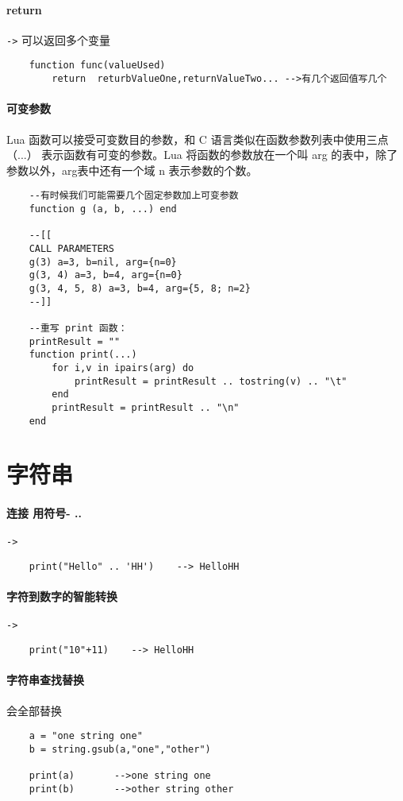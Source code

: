 \documentclass[UTF8,a4paper,12pt]{ctexart}
\begin{document}
	\paragraph{return}\verb|->|
		可以返回多个变量
		 \begin{lstlisting}
	function func(valueUsed)  
		return  returbValueOne,returnValueTwo... -->有几个返回值写几个
		 \end{lstlisting}
		 
	\paragraph{可变参数}Lua 函数可以接受可变数目的参数，和 C 语言类似在函数参数列表中使用三点（...）
	表示函数有可变的参数。Lua 将函数的参数放在一个叫 arg 的表中，除了参数以外，arg表中还有一个域 n 表示参数的个数。
		 \begin{lstlisting}
	--有时候我们可能需要几个固定参数加上可变参数
	function g (a, b, ...) end
	
	--[[ 
	CALL PARAMETERS
	g(3) a=3, b=nil, arg={n=0}
	g(3, 4) a=3, b=4, arg={n=0}
	g(3, 4, 5, 8) a=3, b=4, arg={5, 8; n=2}
	--]]
	
	--重写 print 函数：
	printResult = ""
	function print(...)
		for i,v in ipairs(arg) do
			printResult = printResult .. tostring(v) .. "\t"
		end
		printResult = printResult .. "\n"
	end
		 \end{lstlisting}
\newpage
\section{字符串}
 	 \paragraph{连接 用符号- ..   }\verb|->|
	 		 \begin{lstlisting}
	print("Hello" .. 'HH')    --> HelloHH
	 		 \end{lstlisting}
 		 
 	 \paragraph{字符到数字的智能转换}\verb|->|
	 		  \begin{lstlisting}
	print("10"+11)    --> HelloHH
	 		  \end{lstlisting}
	 		  
	 \paragraph{字符串查找替换}会全部替换
			  \begin{lstlisting}
	a = "one string one"
	b = string.gsub(a,"one","other")
	
	print(a)       -->one string one
	print(b)	   -->other string other
		  	  \end{lstlisting}
	 		  
\end{document}
